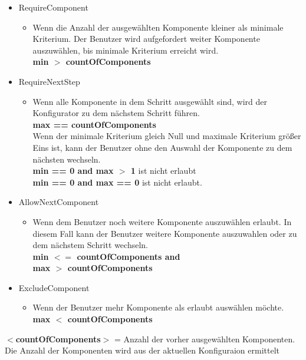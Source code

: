 \documentclass{article}
\begin{document}
\begin{itemize}
    \item RequireComponent 
    \begin{itemize}
        \item Wenn die Anzahl der ausgew\"ahlten Komponente kleiner als minimale
        Kriterium. Der Benutzer wird aufgefordert weiter Komponente
        auszuw\"ahlen, bis minimale Kriterium erreicht wird.\\
        \textbf{min $>$ countOfComponents}
    \end{itemize}
    \item RequireNextStep
        \begin{itemize}
            \item Wenn alle Komponente in dem Schritt ausgew\"ahlt sind, wird
            der Konfigurator zu dem n\"achstem Schritt f\"uhren.\\
            \textbf{max == countOfComponents}\\
            Wenn der minimale Kriterium gleich Null und maximale Kriterium
            gr\"o\ss{}er Eins ist, kann der Benutzer ohne den Auswahl der
            Komponente zu dem n\"achsten wechseln.\\
            \textbf{min == 0 and max $>$ 1} ist nicht erlaubt\\
            \textbf{min == 0 and max == 0} ist nicht erlaubt.
        \end{itemize}
    \item AllowNextComponent
    \begin{itemize}
        \item  Wenn dem Benutzer noch weitere Komponente auszuw\"ahlen erlaubt.
        In diesem Fall kann der Benutzer weitere Komponente auszuwahlen oder zu
        dem n\"achstem Schritt wechseln.\\
        \textbf{min $<=$ countOfComponents and\\ max $>$ countOfComponents}
    \end{itemize}
\item ExcludeComponent
    \begin{itemize}
        \item Wenn der Benutzer mehr Komponente als erlaubt ausw\"ahlen
        möchte.\\
        \textbf{max $<$ countOfComponents}
    \end{itemize}
\end{itemize}

\noindent\textbf{$<$countOfComponents$>$} = Anzahl der vorher
ausgew\"ahlten Komponenten.
Die Anzahl der Komponenten wird aus der aktuellen Konfiguraion ermittelt\\\\
\end{document}
